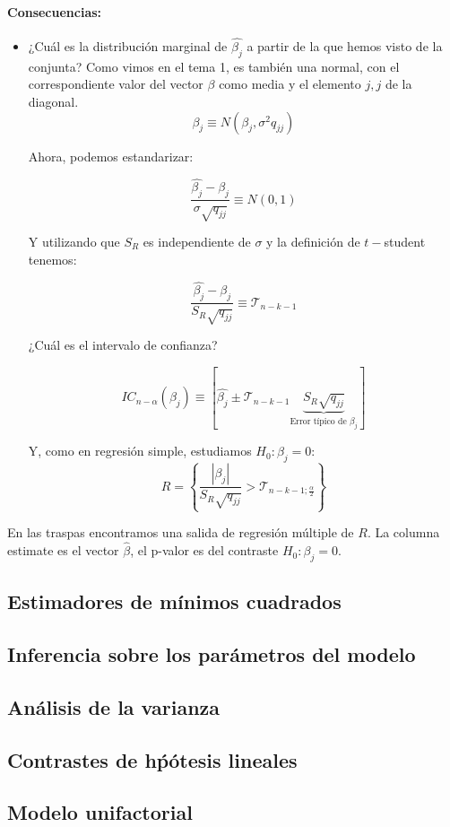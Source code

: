 \paragraph{Consecuencias:}

\begin{itemize}
	\item ¿Cuál es la distribución marginal de $\hat{β_j}$ a partir de la que hemos visto de la conjunta? Como vimos en el tema 1, es también una normal, con el correspondiente valor del vector $β$ como media y el elemento $j,j$ de la diagonal.
	\[ β_j \equiv N\left(β_j, σ^2q_{jj}\right)\]

	Ahora, podemos estandarizar:

	\[
	\frac{\hat{β_j}-β_j}{σ\sqrt{q_{jj}}} \equiv N(0,1)
	\]

	Y utilizando que $S_R$ es independiente de $σ$ y la definición de $t-$student tenemos:

	\[
	\frac{\hat{β_j}-β_j}{S_R\sqrt{q_{jj}}} \equiv \mathcal{T}_{n-k-1}	
	\]

	¿Cuál es el intervalo de confianza?

	\[
		IC_{n-α}(β_j) \equiv \left[\hat{β_j}\pm \mathcal{T}_{n-k-1}\underbrace{S_R\sqrt{q_{jj}}}_{\text{Error típico de }β_j} \right]
	\]

	Y, como en regresión simple, estudiamos $H_0 : β_j = 0$:
	\[
		R = \left\{ \frac{|β_j|}{S_R\sqrt{q_{jj}}} > \mathcal{T}_{n-k-1;\frac{α}{2}} \right\}
	\]
\end{itemize}

En las traspas encontramos una salida de regresión múltiple de $R$. La columna estimate es el vector $\hat{β}$, el p-valor es del contraste $H_0 : β_j = 0$.

\subsection{Estimadores de mínimos cuadrados}
\subsection{Inferencia sobre los parámetros del modelo}
\subsection{Análisis de la varianza}
\subsection{Contrastes de hṕótesis lineales}
\subsection{Modelo unifactorial}